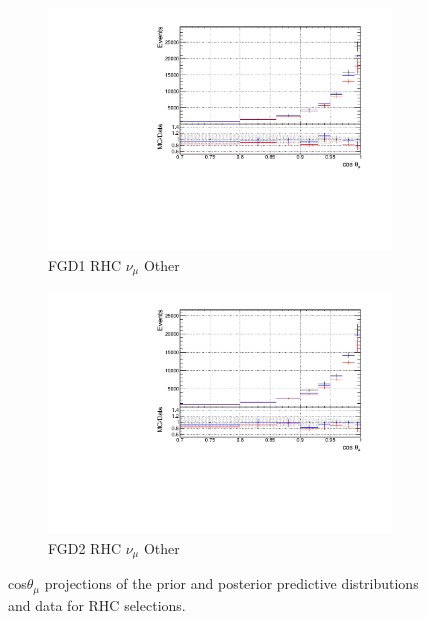 \begin{figure}[!h]
\begin{subfigure}{0.49\textwidth}
  \centering
  \includegraphics[width=\textwidth]{figs/priorpred1D_t_FGD1_NuMuBkg_CCOther_in_AntiNu_Mode}
  \caption{FGD1 RHC $\nu_{\mu}$ Other}
\end{subfigure}
\begin{subfigure}{0.49\textwidth}
  \centering
  \includegraphics[width=\textwidth]{figs/priorpred1D_t_FGD2_NuMuBkg_CCOther_in_AntiNu_Mode}
  \caption{FGD2 RHC $\nu_{\mu}$ Other}
\end{subfigure}
\caption{cos$\theta_{\mu}$ projections of the prior and posterior predictive distributions and data for RHC \numu selections.}
\label{fig:priorpost_rhc_numu_t}
\end{figure}

